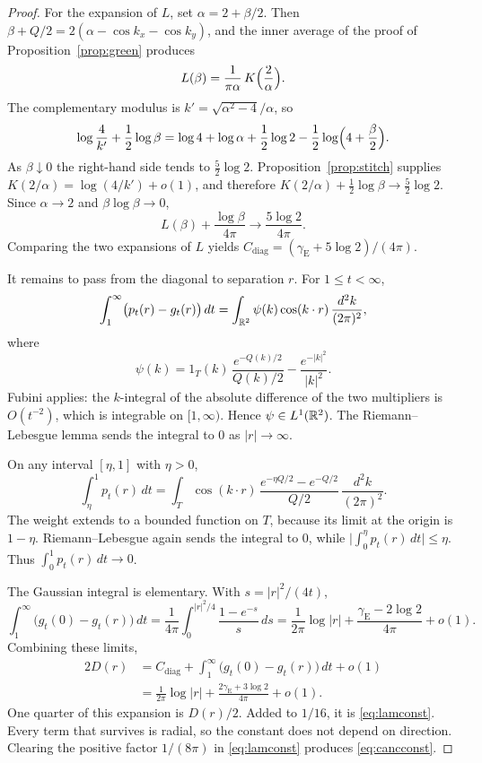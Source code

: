 \begin{proof}
For the expansion of \(L\), set \(\alpha=2+\beta/2\).
Then \(\beta+Q/2=2(\alpha-\cos k_x-\cos k_y)\), and the inner average
of the proof of Proposition~\ref{prop:green} produces
\[
L(\beta)=\frac{1}{\pi\alpha}\,K\Bigl(\frac{2}{\alpha}\Bigr).
\]
The complementary modulus is
\(k'=\sqrt{\alpha^2-4}/\alpha\), so
\[
\log\frac{4}{k'}+\frac12\log\beta
=\log 4+\log\alpha+\frac12\log 2-\frac12\log\Bigl(4+\frac\beta2\Bigr).
\]
As \(\beta\downarrow 0\) the right-hand side tends to \(\tfrac52\log 2\).
Proposition~\ref{prop:stitch} supplies
\(K(2/\alpha)=\log(4/k')+o(1)\), and therefore
\(K(2/\alpha)+\tfrac12\log\beta\to\tfrac52\log 2\).
Since \(\alpha\to 2\) and \(\beta\log\beta\to 0\),
\[
L(\beta)+\frac{\log\beta}{4\pi}
\to\frac{5\log 2}{4\pi}.
\]
Comparing the two expansions of \(L\) yields
\(C_{\mathrm{diag}}=(\gamma_{\mathrm{E}}+5\log 2)/(4\pi)\).

It remains to pass from the diagonal to separation \(r\).
For \(1\le t<\infty\),
\[
\int_1^\infty\bigl(p_t(r)-g_t(r)\bigr)\,dt
=\int_{\mathbb{R}^2}\psi(k)\cos(k\cdot r)\,\frac{d^2k}{(2\pi)^2},
\]
where
\[
\psi(k)
=1_T(k)\,\frac{e^{-Q(k)/2}}{Q(k)/2}
-\frac{e^{-|k|^2}}{|k|^2}.
\]
Fubini applies: the \(k\)-integral of the absolute difference of the two
multipliers is \(O(t^{-2})\), which is integrable on \([1,\infty)\).
Hence \(\psi\in L^1(\mathbb{R}^2)\).
The Riemann–Lebesgue lemma sends the integral to \(0\) as \(|r|\to\infty\).

On any interval \([\eta,1]\) with \(\eta>0\),
\[
\int_\eta^1 p_t(r)\,dt
=\int_T\cos(k\cdot r)\,
\frac{e^{-\eta Q/2}-e^{-Q/2}}{Q/2}
\,\frac{d^2k}{(2\pi)^2}.
\]
The weight extends to a bounded function on \(T\), because its limit at the
origin is \(1-\eta\).
Riemann–Lebesgue again sends the integral to \(0\), while
\(\bigl|\int_0^\eta p_t(r)\,dt\bigr|\le\eta\).
Thus \(\int_0^1 p_t(r)\,dt\to 0\).

The Gaussian integral is elementary.
With \(s=|r|^2/(4t)\),
\[
\int_1^\infty\bigl(g_t(0)-g_t(r)\bigr)\,dt
=\frac{1}{4\pi}\int_0^{|r|^2/4}\frac{1-e^{-s}}{s}\,ds
=\frac{1}{2\pi}\log|r|
+\frac{\gamma_{\mathrm{E}}-2\log 2}{4\pi}+o(1).
\]
Combining these limits,
\begin{align*}
2D(r)
&=C_{\mathrm{diag}}
+\int_1^\infty\bigl(g_t(0)-g_t(r)\bigr)\,dt+o(1)\\
&=\frac{1}{2\pi}\log|r|
+\frac{2\gamma_{\mathrm{E}}+3\log 2}{4\pi}+o(1).
\end{align*}
One quarter of this expansion is \(D(r)/2\).
Added to \(1/16\), it is \eqref{eq:lamconst}.
Every term that survives is radial, so the constant does not depend on
direction.
Clearing the positive factor \(1/(8\pi)\) in \eqref{eq:lamconst} produces
\eqref{eq:cancconst}.
\end{proof}

